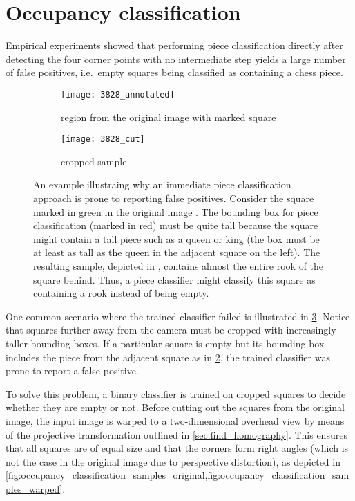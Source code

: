 \documentclass[../report.tex]{subfiles}
\begin{document}
\section{Occupancy classification}
\label{sec:occupancy_classification}
Empirical experiments showed that performing piece classification directly after detecting the four corner points with no intermediate step yields a large number of false positives, i.e.\ empty squares being classified as containing a chess piece.
\begin{figure}
    \centering
    \begin{subfigure}[b]{0.65\textwidth}
        \centering
        \texttt{[image: 3828\_annotated]}
        \caption{region from the original image with marked square}
        \label{fig:occupancy_classification_fp_original}
    \end{subfigure}
    \hfill
    \begin{subfigure}[b]{0.3\textwidth}
        \centering
        \texttt{[image: 3828\_cut]}
        \caption{cropped sample}
        \label{fig:occupancy_classification_fp_cropped}
    \end{subfigure}
    \caption[An example illustrating why an immediate piece classification approach is prone to reporting false positives.]{An example illustraing why an immediate piece classification approach is prone to reporting false positives. Consider the square marked in green in the original image . The bounding box for piece classification (marked in red) must be quite tall because the square might contain a tall piece such as a queen or king (the box must be at least as tall as the queen in the adjacent square on the left). The resulting sample, depicted in , contains almost the entire rook of the square behind. Thus, a piece classifier might classify this square as containing a rook instead of being empty.}
    \label{fig:occupancy_classification_fp}
\end{figure}
One common scenario where the trained classifier failed is illustrated in \cref{fig:occupancy_classification_fp}.
Notice that squares further away from the camera must be cropped with increasingly taller bounding boxes.
If a particular square is empty but its bounding box includes the piece from the adjacent square as in \cref{fig:occupancy_classification_fp_cropped}, the trained classifier was prone to report a false positive.

To solve this problem, a binary classifier is trained on cropped squares to decide whether they are empty or not.
Before cutting out the squares from the original image, the input image is warped to a two-dimensional overhead view by means of the projective transformation outlined in \cref{sec:find_homography}.
This ensures that all squares are of equal size and that the corners form right angles (which is not the case in the original image due to perspective distortion), as depicted in \cref{fig:occupancy_classification_samples_original,fig:occupancy_classification_samples_warped}.
\end{document}
